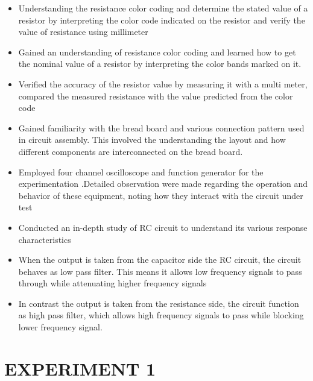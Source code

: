 \documentclass[11pt]{scrreprt}
\begin{document}
\begin{itemize}
    
\item  Understanding the resistance color coding and determine the stated value of a resistor by interpreting the color code indicated on the resistor and verify the value of resistance using millimeter

\item  Gained an understanding of resistance color coding and learned how to get the nominal value of a resistor by interpreting the color bands marked on it. 

\item  Verified the accuracy of the resistor value by measuring it with a multi meter, compared the measured resistance with the value predicted from the color code 

\item  Gained familiarity with the bread board and various connection pattern used in circuit assembly. This involved the understanding the layout and how different components are interconnected on the bread board.

\item  Employed four channel oscilloscope and function generator for the experimentation .Detailed observation were made regarding the operation and behavior of these equipment, noting how they interact with the circuit under test 

\item  Conducted an in-depth study of RC circuit to understand its various response characteristics 

\item  When the output is taken from the capacitor side the RC circuit, the circuit behaves as low pass filter. This means it allows low frequency signals to pass through while attenuating higher frequency signals 

\item  In contrast the output is taken from the resistance side, the circuit function as high pass filter, which allows high frequency signals to pass while blocking lower frequency signal.

\end{itemize}

\newpage
\section*{\centering EXPERIMENT 1}
\end{document}
